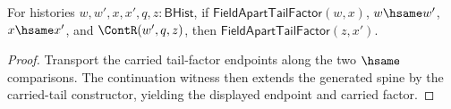 \begin{theorem}
\label{thm:field-apart-tail-factor-continuation-hsame-closure}
For histories $w,w',x,x',q,z:\mathsf{BHist}$, if
$\mathsf{FieldApartTailFactor}(w,x)$, $w\hsame w'$, $x\hsame x'$, and
$\ContR(w',q,z)$, then $\mathsf{FieldApartTailFactor}(z,x')$.
\end{theorem}
\begin{proof}
Transport the carried tail-factor endpoints along the two $\hsame$
comparisons. The continuation witness then extends the generated spine by the
carried-tail constructor, yielding the displayed endpoint and carried factor.
\end{proof}
